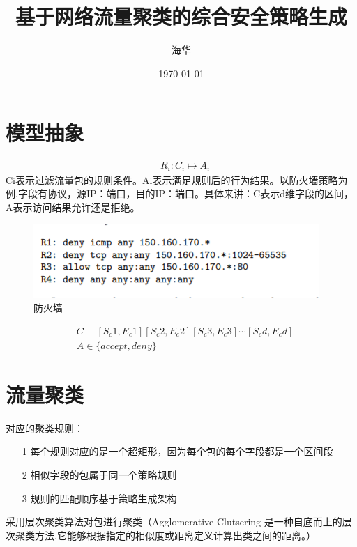 \documentclass[UTF8]{ctexart}
\title{\heiti 基于网络流量聚类的综合安全策略生成}
\author{\kaishu 海华}
\date{\today}
\begin{document}
	\section{模型抽象}\label{sec:diyijie}
	\begin{equation}\label{eq:yi}
	    \begin{aligned}
		    &R_i: C_i \mapsto A_i
    	\end{aligned}
    \end{equation}
	Ci表示过滤流量包的规则条件。Ai表示满足规则后的行为结果。以防火墙策略为例,字段有协议，源IP：端口，目的IP：端口。具体来讲：C表示d维字段的区间，A表示访问结果允许还是拒绝。
	\begin{figure}[ht]
        \centering
        \includegraphics[scale=2.0]{picture/001.png}
        \caption{防火墙}
        \label{fig:001}
    \end{figure}
	\begin{equation}\label{eq:er}
	    \begin{aligned}
		    &C \equiv [S_c1,E_c1] [S_c2,E_c2] [S_c3,E_c3] \cdots[S_cd,E_cd] \\ &A \in \{accept,deny\}
		\end{aligned}
    \end{equation}
	\clearpage
	\section{流量聚类}\label{sec:dierjie}
	对应的聚类规则：
		\begin{itemize}
		\item[1] 每个规则对应的是一个超矩形，因为每个包的每个字段都是一个区间段
		\item[2] 相似字段的包属于同一个策略规则
		\item[3] 规则的匹配顺序基于策略生成架构
		\end{itemize}
	采用层次聚类算法对包进行聚类（Agglomerative Clutsering 是一种自底而上的层次聚类方法,它能够根据指定的相似度或距离定义计算出类之间的距离。）

	\clearpage
\end{document}
